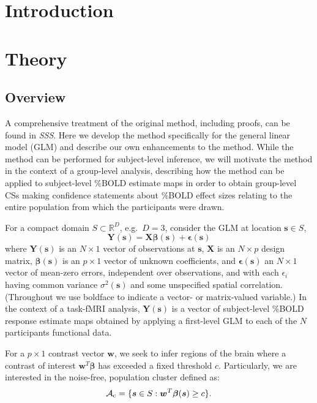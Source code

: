 \section{Introduction}

\section{Theory}

\subsection{Overview}
\label{sec:Overview}
A comprehensive treatment of the original method, including proofs, can be found in \textit{SSS}.  Here we develop the method specifically for the general linear model (GLM) and describe our own enhancements to the method. While the method can be performed for subject-level inference, we will motivate the method in the context of a group-level analysis, describing how the method can be applied to subject-level \%BOLD estimate maps in order to obtain group-level CSs making confidence statements about \%BOLD effect sizes relating to the entire population from which the participants were drawn.

For a compact domain $S \subset \mathbb{R}^{D}$, e.g.~$D=3$, consider the GLM at location $\bm{s} \in S$,
\begin{equation}
\label{eq:CI_GLM}
\bm{Y}(\bm{s}) = \bm{X}\bm{\beta}(\bm{s}) + \bm{\epsilon}(\bm{s})	
\end{equation}
where $\bm{Y}(\bm{s})$ is an $N \times 1$ vector of observations at  $\bm{s}$, $\bm{X}$ is an $N \times p$ design matrix, $\bm{\beta}(\bm{s})$ is an $p \times 1$ vector of unknown coefficients, and $\bm{\epsilon}(\bm{s})$ an $N \times 1$ vector of mean-zero errors, independent over observations, and with each $\epsilon_i$ having common variance $\sigma^2(\bm{s})$ and some unspecified spatial correlation. (Throughout we use boldface to indicate a vector- or matrix-valued variable.) In the context of a  task-fMRI analysis, $\bm{Y}(\bm{s})$ is a vector of subject-level \%BOLD response estimate maps obtained by applying a first-level GLM to each of the $N$ participants functional data. 

For a $p \times 1$ contrast vector $\bm{w}$, we seek to infer regions of the brain where a contrast of interest $\bm{w}^{T}\bm{\beta}$ has exceeded a fixed threshold  $c$. Particularly, we are interested in the noise-free, population cluster defined as: 
\begin{equation}
\label{eq:CI_excursion}
\operatorname{\mathcal{A}_{c}} = \{\bm{s} \in S : \bm{w}^{T}\bm{\beta}(\bm{s}) \geq c \}.
\end{equation}

